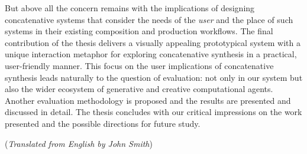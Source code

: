 But above all the concern remains with the implications of designing concatenative systems that consider the needs of the \textit{user} and the place of such systems in their existing composition and production workflows. The final contribution of the thesis delivers a visually appealing prototypical system with a unique interaction metaphor for exploring concatenative synthesis in a practical, user-friendly manner. This focus on the user implications of concatenative synthesis leads naturally to the question of evaluation: not only in our system but also the wider ecosystem of generative and creative computational agents. Another evaluation methodology is proposed and the results are presented and discussed in detail. The thesis concludes with our critical impressions on the work presented and the possible directions for future study.

\vfill
{\small \noindent (\emph{Translated from English by John Smith})}